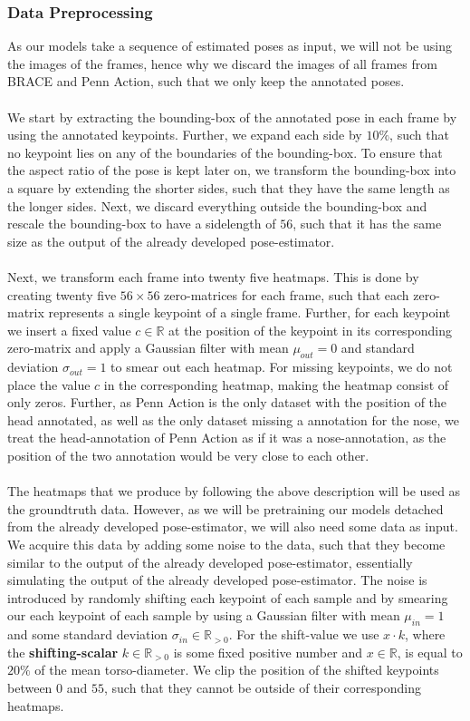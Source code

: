 \documentclass[./main.tex]{subfiles}
\begin{document}
\subsubsection{Data Preprocessing}
As our models take a sequence of estimated poses as input, we will not be using the images of the frames, hence why we discard the images of all frames from BRACE and Penn Action, such that we only keep the annotated poses.
\\
\\
We start by extracting the bounding-box of the annotated pose in each frame by using the annotated keypoints. Further, we expand each side by $10\%$, such that no keypoint lies on any of the boundaries of the bounding-box. To ensure that the aspect ratio of the pose is kept later on, we transform the bounding-box into a square by extending the shorter sides, such that they have the same length as the longer sides. Next, we discard everything outside the bounding-box and rescale the bounding-box to have a sidelength of $56$, such that it has the same size as the output of the already developed pose-estimator.
\\
\\
Next, we transform each frame into twenty five heatmaps. This is done by creating twenty five $56 \times 56$ zero-matrices for each frame, such that each zero-matrix represents a single keypoint of a single frame. Further, for each keypoint we insert a fixed value $c \in \mathbb{R}$ at the position of the keypoint in its corresponding zero-matrix and apply a Gaussian filter with mean $\mu_{out} = 0$ and standard deviation $\sigma_{out} = 1$ to smear out each heatmap. For missing keypoints, we do not place the value $c$ in the corresponding heatmap, making the heatmap consist of only zeros. Further, as Penn Action is the only dataset with the position of the head annotated, as well as the only dataset missing a annotation for the nose, we treat the head-annotation of Penn Action as if it was a nose-annotation, as the position of the two annotation would be very close to each other.
\\
\\
The heatmaps that we produce by following the above description will be used as the groundtruth data. However, as we will be pretraining our models detached from the already developed pose-estimator, we will also need some data as input. We acquire this data by adding some noise to the data, such that they become similar to the output of the already developed pose-estimator, essentially simulating the output of the already developed pose-estimator. The noise is introduced by randomly shifting each keypoint of each sample and by smearing our each keypoint of each sample by using a Gaussian filter with mean $\mu_{in} = 1$ and some standard deviation $\sigma_{in} \in \mathbb{R}_{>0}$. For the shift-value we use $x \cdot k$, where the \textbf{shifting-scalar} $k \in \mathbb{R}_{>0}$ is some fixed positive number and $x \in \mathbb{R}$, is equal to $20\%$ of the mean torso-diameter. We clip the position of the shifted keypoints between $0$ and $55$, such that they cannot be outside of their corresponding heatmaps. 
\end{document}
